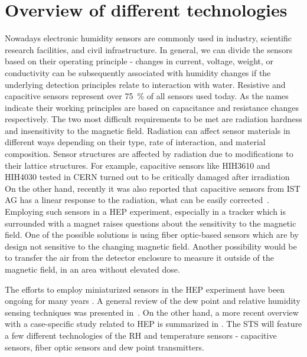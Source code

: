 \section{Overview of different technologies}

Nowadays electronic humidity sensors are commonly used in industry, scientific research facilities, and civil infrastructure. In general, we can divide the sensors based on their operating principle - changes in current, voltage, weight, or conductivity can be subsequently associated with humidity changes if the underlying detection principles relate to interaction with water. Resistive and capacitive sensors represent over 75~\% of all sensors used today. As the names indicate their working principles are based on capacitance and resistance changes respectively. The two most difficult requirements to be met are radiation hardness and insensitivity to the magnetic field. Radiation can affect sensor materials in different ways depending on their type, rate of interaction, and material composition. Sensor structures are affected by radiation due to modifications to their lattice structures. For example, capacitive sensors like HIH3610 and HIH4030 tested in CERN turned out to be critically damaged after irradiation~\cite{Berruti} On the other hand, recently it was also reported that capacitive sensors from IST AG has a linear response to the radiation, what can be easily corrected~\cite{Kapic_sensor}. Employing such sensors in a \gls{HEP} experiment, especially in a tracker which is surrounded with a magnet raises questions about the sensitivity to the magnetic field. One of the possible solutions is using fiber optic-based sensors which are by design not sensitive to the changing magnetic field. Another possibility would be to transfer the air from the detector enclosure to measure it outside of the magnetic field, in an area without elevated dose. 

The efforts to employ miniaturized sensors in the \gls{HEP} experiment have been ongoing for many years \cite{Berruti}. A general review of the dew point and relative humidity sensing techniques was presented in~\cite{RITTERSMA}. On the other hand, a more recent overview with a case-specific study related to \gls{HEP} is summarized in \cite{Kapic}. The \gls{STS} will feature a few different technologies of the \gls{RH} and temperature sensors - capacitive sensors, fiber optic sensors and dew point transmitters. 


